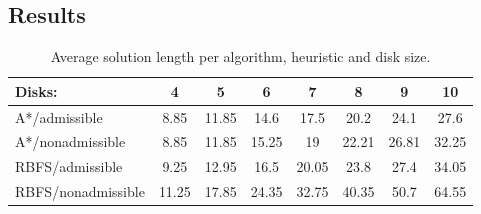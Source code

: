 \subsection{Results}

\begin{table}[h]
    \centering
    \begin{tabular}{|l|c|c|c|c|c|c|c}
        \hline
        Disks: & 4 & 5 & 6 & 7 & 8 & 9 & 10\\ \hline
        A*/admissible & 8.85 & 11.85 & 14.6 & 17.5 & 20.2 & 24.1 & 27.6\\ \hline
        A*/nonadmissible & 8.85 & 11.85 & 15.25 & 19 & 22.21 & 26.81 & 32.25 \\ \hline
        RBFS/admissible & 9.25 & 12.95 & 16.5 & 20.05 & 23.8 & 27.4 & 34.05\\ \hline
        RBFS/nonadmissible & 11.25 & 17.85 & 24.35 & 32.75 & 40.35 & 50.7 & 64.55\\ \hline
    \end{tabular}
    \caption{Average solution length per algorithm, heuristic and disk size.}\label{tab:solen}
\end{table}


